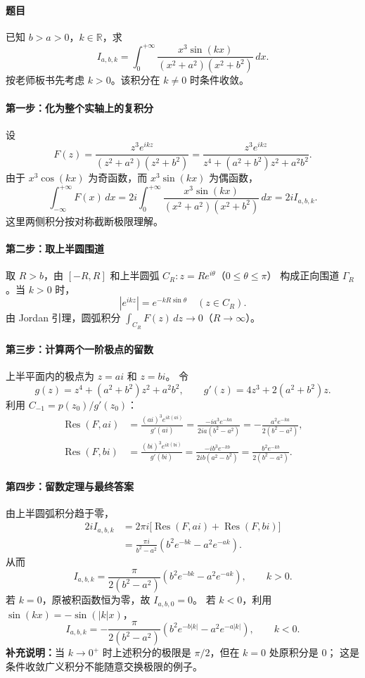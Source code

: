\paragraph{题目} 已知 $b>a>0$，$k\in\mathbb R$，求
\[
 I_{a,b,k}=\int_0^{+\infty}
 \frac{x^3\sin(kx)}{(x^2+a^2)(x^2+b^2)}\,dx.
\]
按老师板书先考虑 $k>0$。该积分在 $k\ne0$ 时条件收敛。

\paragraph{第一步：化为整个实轴上的复积分}
设
\[
 F(z)=\frac{z^3e^{ikz}}{(z^2+a^2)(z^2+b^2)}
     =\frac{z^3e^{ikz}}
     {z^4+(a^2+b^2)z^2+a^2b^2}.
\]
由于 $x^3\cos(kx)$ 为奇函数，而 $x^3\sin(kx)$
为偶函数，
\[
 \int_{-\infty}^{+\infty}F(x)\,dx
 =2i\int_0^{+\infty}
    \frac{x^3\sin(kx)}{(x^2+a^2)(x^2+b^2)}\,dx
 =2iI_{a,b,k}.
\]
这里两侧积分按对称截断极限理解。

\paragraph{第二步：取上半圆围道}
取 $R>b$，由 $[-R,R]$ 和上半圆弧
$C_R:z=Re^{i\theta}$（$0\le\theta\le\pi$）
构成正向围道 $\Gamma_R$。当 $k>0$ 时，
\[
 |e^{ikz}|=e^{-kR\sin\theta}
 \quad(z\in C_R).
\]
由 Jordan 引理，圆弧积分
$\int_{C_R}F(z)\,dz\to0$（$R\to\infty$）。

\paragraph{第三步：计算两个一阶极点的留数}
上半平面内的极点为 $z=ai$ 和 $z=bi$。
令
\[
 g(z)=z^4+(a^2+b^2)z^2+a^2b^2,\qquad
 g'(z)=4z^3+2(a^2+b^2)z.
\]
利用 $C_{-1}=p(z_0)/g'(z_0)$：
\begin{align*}
 \operatorname{Res}(F,ai)
 &=\frac{(ai)^3e^{ik(ai)}}{g'(ai)}
 =\frac{-ia^3e^{-ka}}{2ia(b^2-a^2)}
 =-\frac{a^2e^{-ka}}{2(b^2-a^2)},\\
 \operatorname{Res}(F,bi)
 &=\frac{(bi)^3e^{ik(bi)}}{g'(bi)}
 =\frac{-ib^3e^{-kb}}{2ib(a^2-b^2)}
 =\frac{b^2e^{-kb}}{2(b^2-a^2)}.
\end{align*}

\paragraph{第四步：留数定理与最终答案}
由上半圆弧积分趋于零，
\begin{align*}
 2iI_{a,b,k}
 &=2\pi i\bigl[\operatorname{Res}(F,ai)
                   +\operatorname{Res}(F,bi)\bigr]\\
 &=\frac{\pi i}{b^2-a^2}
    \left(b^2e^{-bk}-a^2e^{-ak}\right).
\end{align*}
从而
\[
 \boxed{I_{a,b,k}
 =\frac{\pi}{2(b^2-a^2)}
   \left(b^2e^{-bk}-a^2e^{-ak}\right),\qquad k>0.}
\]
若 $k=0$，原被积函数恒为零，故 $I_{a,b,0}=0$。
若 $k<0$，利用 $\sin(kx)=-\sin(|k|x)$，
\[
 \boxed{I_{a,b,k}
 =-\frac{\pi}{2(b^2-a^2)}
   \left(b^2e^{-b|k|}-a^2e^{-a|k|}\right),\qquad k<0.}
\]
\textbf{补充说明：}当 $k\to0^+$ 时上述积分的极限是
$\pi/2$，但在 $k=0$ 处原积分是 $0$；
这是条件收敛广义积分不能随意交换极限的例子。


